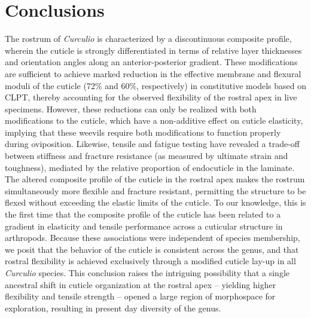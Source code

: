 \documentclass[twocolumn, linenumbers, superscriptaddress, nofootinbib]{revtex4-1}
\begin{document}
	\section{Conclusions}
		The rostrum of \textit{Curculio} is characterized by a discontinuous composite profile, wherein the cuticle is strongly differentiated in terms of relative layer thicknesses and orientation angles along an anterior-posterior gradient.		
		These modifications are sufficient to achieve marked reduction in the effective membrane and flexural moduli of the cuticle (72\% and 60\%, respectively) in constitutive models based on CLPT, thereby accounting for the observed flexibility of the rostral apex in live specimens.
		However, these reductions can only be realized with both modifications to the cuticle, which have a non-additive effect on cuticle elasticity, implying that these weevils require both modifications to function properly during oviposition.
		Likewise, tensile and fatigue testing have revealed a trade-off between stiffness and fracture resistance (as measured by ultimate strain and toughness), mediated by the relative proportion of endocuticle in the laminate.
		The altered composite profile of the cuticle in the rostral apex makes the rostrum simultaneously more flexible and fracture resistant, permitting the structure to be flexed without exceeding the elastic limits of the cuticle.
		To our knowledge, this is the first time that the composite profile of the cuticle has been related to a gradient in elasticity and tensile performance across a cuticular structure in arthropods.
		Because these associations were independent of species membership, we posit that the behavior of the cuticle is consistent across the genus, and that rostral flexibility is achieved exclusively through a modified cuticle lay-up in all \textit{Curculio} species.
		This conclusion raises the intriguing possibility that a single ancestral shift in cuticle organization at the rostral apex -- yielding higher flexibility and tensile strength -- opened a large region of morphospace for exploration, resulting in present day diversity of the genus.
		
\end{document}
